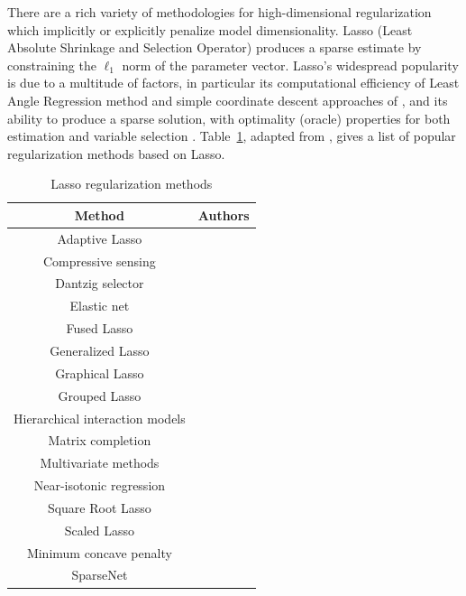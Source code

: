 \documentclass[sts,preprint]{imsart}
\begin{document}
There are a rich variety of methodologies for high-dimensional regularization which implicitly or explicitly penalize model
 dimensionality. Lasso (Least Absolute Shrinkage and Selection Operator) produces a sparse estimate by constraining the $\ell_1$ 
norm of the parameter vector. Lasso's widespread popularity is due to a multitude of factors, in particular its computational 
efficiency of Least Angle Regression method \citep{efron_least_2004} and simple coordinate descent approaches of 
\citet{friedman_pathwise_2007}, and its ability to produce a sparse solution, with optimality (oracle) properties for both estimation 
and variable selection \citep[\textit{vide}][]{buhlmann2011statistics, james2013introduction, hastie2015statistical}. 
Table~\ref{tab:lasso:ext}, adapted from \citet{tibshirani2014praise},  gives a list of popular regularization methods based on Lasso.
\par 


\begin{table}[ht!]
  \centering
  \caption{Lasso regularization methods}
  \footnotesize{
    \begin{tabular}{|c|c|}
    \hline
    Method  & Authors  \bigstrut\\
    \hline
    Adaptive Lasso & \citet{zou2006adaptive} \bigstrut[t]\\
    Compressive sensing  & \citet{donoho2006compressed,candes2008restricted} \\
    Dantzig selector  & \citet{candes2007dantzig} \\
    Elastic net & \citet{zou2005regularization} \\
    Fused Lasso & \citet{tibshirani_sparsity_2005} \\
    Generalized Lasso & \citet{tibshirani2011solution} \\
    Graphical Lasso & \citet{friedman2008sparse} \\
    Grouped Lasso & \citet{yuan2006model} \\
    Hierarchical interaction models & \citet{bien_lasso_2013} \\
    Matrix completion & \citet{candes2010power,mazumder2010spectral} \\
    Multivariate methods & \citet{jolliffe2003modified,witten2009penalized} \\
    Near-isotonic regression & \citet{tibshirani2011nearly} \\
    Square Root Lasso  & \citet{belloni2011square} \\
    Scaled Lasso & \citet{sun2012scaled} \\
    Minimum concave penalty & \citet{zhang2010nearly} \\
    SparseNet & \citet{mazumder2012} \bigstrut[b]\\
    \hline
    \end{tabular}%
    }
  \label{tab:lasso:ext}%
\end{table}%
\end{document}
